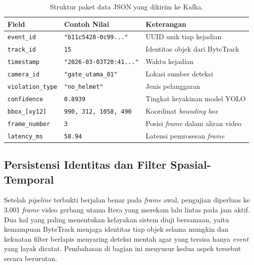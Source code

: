 \begin{table}[htbp]
\centering
\caption{Struktur paket data JSON yang dikirim ke Kafka.}
\label{tab:json-output}
\footnotesize
\setlength{\tabcolsep}{4pt}
\begin{tabular}{p{} p{} p{}}
\toprule
\textbf{Field} & \textbf{Contoh Nilai} & \textbf{Keterangan} \\
\midrule
\texttt{event\_id}     & \texttt{"b11c5428-0c99..."}    & UUID unik tiap kejadian \\
\texttt{track\_id}     & \texttt{15}                    & Identitas objek dari ByteTrack \\
\texttt{timestamp}     & \texttt{"2026-03-03T20:41..."} & Waktu kejadian \\
\texttt{camera\_id}    & \texttt{"gate\_utama\_01"}     & Lokasi sumber deteksi \\
\texttt{violation\_type} & \texttt{"no\_helmet"}         & Jenis pelanggaran \\
\texttt{confidence}    & \texttt{0.8939}                & Tingkat keyakinan model YOLO \\
\texttt{bbox\_[xy12]}  & \texttt{990, 312, 1058, 490}   & Koordinat \textit{bounding box} \\
\texttt{frame\_number} & \texttt{3}                     & Posisi \textit{frame} dalam aliran video \\
\texttt{latency\_ms}   & \texttt{58.94}                 & Latensi pemrosesan \textit{frame} \\
\bottomrule
\end{tabular}
\end{table}

% 
\subsection{Persistensi Identitas dan Filter Spasial-Temporal}
\label{subsec:persistensi-filter}

Setelah \textit{pipeline} terbukti berjalan benar pada \textit{frame} awal, pengujian diperluas ke 3.001 \textit{frame} video gerbang utama Itera yang merekam lalu lintas pada jam aktif. Dua hal yang paling menentukan kelayakan sistem diuji bersamaan, yaitu kemampuan ByteTrack menjaga identitas tiap objek selama mungkin dan kekuatan filter berlapis menyaring deteksi mentah agar yang tersisa hanya \textit{event} yang layak dicatat. Pembahasan di bagian ini menyusur kedua aspek tersebut secara berurutan.

